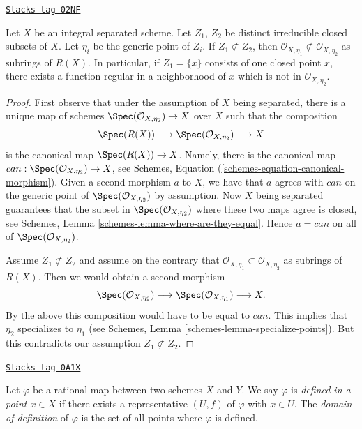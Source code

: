 \begin{lemma}
\label{morphisms-lemma-distinct-local-rings}
\href{https://stacks.math.columbia.edu/tag/02NF}{\texttt{Stacks tag 02NF}}

Let $X$ be an integral separated scheme.
Let $Z_1$, $Z_2$ be distinct irreducible closed subsets of $X$.
Let $\eta_i$ be the generic point of $Z_i$.
If $Z_1 \not\subset Z_2$, then
$\mathcal{O}_{X, \eta_1} \not \subset \mathcal{O}_{X, \eta_2}$
as subrings of $R(X)$.
In particular, if $Z_1 = \{x\}$ consists of one closed point $x$,
there exists a function regular in a neighborhood of $x$
which is not in $\mathcal{O}_{X, \eta_{2}}$.
\end{lemma}

\begin{proof}
First observe that under the assumption of $X$ being separated,
there is a unique map of schemes
$\Spec(\mathcal{O}_{X, \eta_2}) \to X$ over $X$
such that the composition
$$
\Spec(R(X)) \longrightarrow
\Spec(\mathcal{O}_{X, \eta_2}) \longrightarrow X
$$
is the canonical map $\Spec(R(X)) \to X$.
Namely, there is the canonical map
$can : \Spec(\mathcal{O}_{X, \eta_2}) \to X$, see
Schemes, Equation (\ref{schemes-equation-canonical-morphism}).
Given a second morphism $a$ to $X$, we have that $a$ agrees with $can$
on the generic point of
$\Spec(\mathcal{O}_{X, \eta_2})$ by assumption.
Now $X$ being separated guarantees that the subset in
$\Spec(\mathcal{O}_{X, \eta_2})$ where
these two maps agree is closed, see
Schemes, Lemma \ref{schemes-lemma-where-are-they-equal}.
Hence $a = can$ on all of $\Spec(\mathcal{O}_{X, \eta_2})$.

\medskip\noindent
Assume $Z_1 \not \subset Z_2$ and assume on the contrary that
$\mathcal{O}_{X, \eta_{1}} \subset \mathcal{O}_{X, \eta_{2}}$
as subrings of $R(X)$. Then we would obtain a second morphism
$$
\Spec(\mathcal{O}_{X, \eta_{2}}) \longrightarrow
\Spec(\mathcal{O}_{X, \eta_{1}}) \longrightarrow
X.
$$
By the above this composition would have to be equal to $can$.
This implies that $\eta_2$ specializes to $\eta_1$ (see
Schemes, Lemma \ref{schemes-lemma-specialize-points}).
But this contradicts our assumption $Z_1 \not \subset Z_2$.
\end{proof}

\begin{definition}
\label{morphisms-definition-domain-of-definition}
\href{https://stacks.math.columbia.edu/tag/0A1X}{\texttt{Stacks tag 0A1X}}

Let $\varphi$ be a rational map between two schemes $X$ and $Y$. We say
$\varphi$ is {\it defined in a point $x \in X$} if there exists a
representative $(U, f)$ of $\varphi$ with $x \in U$. The
{\it domain of definition} of $\varphi$ is the set of all points
where $\varphi$ is defined.
\end{definition}

